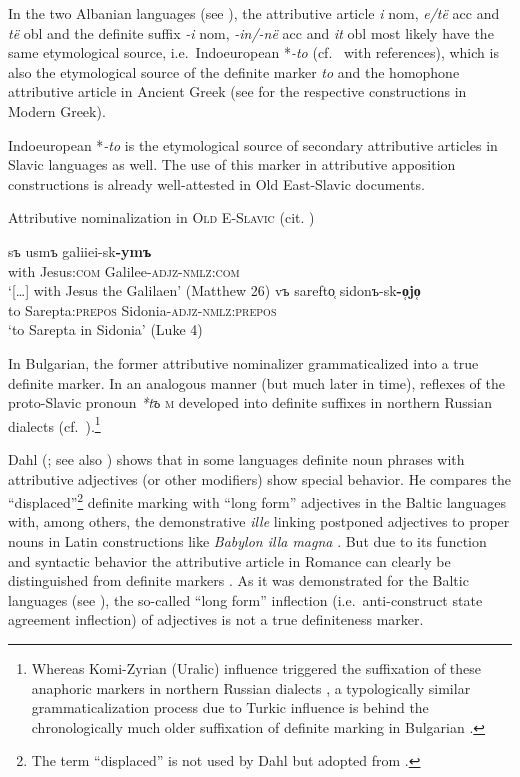 {In the two Albanian languages (see ), the attributive article \textit{i} {\sc nom}, \textit{e/të} {\sc acc} and \textit{të} {\sc obl} and the definite suffix \textit{-i} {\sc nom}, \textit{-in/-në} {\sc acc} and \textit{it} {\sc obl} most likely have the same etymological source, i.e.~Indoeuropean *\textit{-to} (cf.~\citet[165]{himmelmann1997} with references), which is also the etymological source of the definite marker \textit{to} and the homophone attributive article in Ancient Greek (see  for the respective constructions in Modern Greek).

Indoeuropean *\textit{-to} is the etymological source of secondary attributive articles in Slavic languages as well. The use of this marker in attributive apposition constructions is already well-attested in Old East-Slavic documents.
\begin{exe}
\ex Attributive nominalization in \textsc{Old E-Slavic} (cit. \citealt[214]{mendoza2004})
\begin{xlist}
\ex
\gll	[\dots] sъ usmъ galiiei-sk\textbf{-ymъ}\\
	{ } with Jesus:\textsc{com} Galilee-\textsc{adjz}-\textsc{nmlz:com}\\
\glt 	‘[\dots] with Jesus the Galilaen’ (Matthew 26)
\ex 
\gll	vъ sarefto̜ sidonъ-sk\textbf{-o̜jo̜}\\
	to Sarepta:\textsc{prepos} Sidonia-\textsc{adjz}-\textsc{nmlz:prepos}\\
\glt 	‘to Sarepta in Sidonia’ (Luke 4)
\end{xlist}
\end{exe}
In Bulgarian, the former attributive nominalizer grammaticalized into a true definite marker. In an analogous manner (but much later in time), reflexes of the proto-Slavic pronoun \textit{*tъ} \textsc{m} developed into definite suffixes in northern Russian dialects (cf.~\citealt
{leinonen2006a}).\footnote{Whereas Komi-Zyrian (Uralic) influence triggered the suffixation of these anaphoric markers in northern Russian dialects \citep
{leinonen2006a}, a typologically similar grammaticalization process due to Turkic influence is behind the chronologically much older suffixation of definite marking in Bulgarian \citep[114–122]{kusmenko2008}.}

Dahl (\citeyear[149–152]{dahl2003}; see also \citealt[115]{dahl2007}) shows that in some languages definite noun phrases with attributive adjectives (or other modifiers) show special behavior. He compares the “displaced”\footnote{The term “displaced” is not used by Dahl but adopted from \citet[114–116]{melcuk2006}.} definite marking with “long form” adjectives in the Baltic languages with, among others, the demonstrative \textit{ille} linking postponed adjectives to proper nouns in Latin constructions like \textit{Babylon illa magna} \cite[150]{dahl2003}. But due to its function and syntactic behavior the attributive article in Romance can clearly be distinguished from definite markers \citep[329]{gamillscheg1937}. As it was demonstrated for the Baltic languages (see ), the so-called “long form” inflection (i.e.~anti-construct state agreement inflection) of adjectives is not a true definiteness marker.

}

